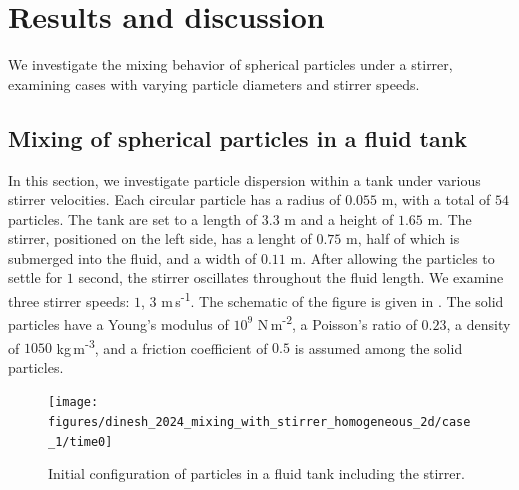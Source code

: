 \documentclass[preprint,12pt]{elsarticle}
\begin{document}











\FloatBarrier%
\section{Results and discussion}
\label{sec:results}
We investigate the mixing behavior of spherical particles under a stirrer,
examining cases with varying particle diameters and stirrer speeds.

\subsection{Mixing of spherical particles in a fluid tank}
\label{sec:mixing-spherical-particles-in-fluid-tank-homogeneous}
In this section, we investigate particle dispersion within a tank under
various stirrer velocities. Each circular particle has a radius of $0.055$ m,
with a total of $54$ particles. The tank are set to a length of $3.3$ m and a
height of $1.65$ m. The stirrer, positioned on the left side, has a lenght of
$0.75$ m, half of which is submerged into the fluid, and a width of $0.11$
m. After allowing the particles to settle for $1$ second, the stirrer
oscillates throughout the fluid length. We examine three stirrer speeds: $1$,
$3$ m\,s\textsuperscript{-1}.  The schematic of the figure is given in
. The solid particles have a
Young's modulus of $10^{9}$ N\,m\textsuperscript{-2}, a Poisson's ratio of
$0.23$, a density of $1050$ kg\,m\textsuperscript{-3}, and a friction
coefficient of $0.5$ is assumed among the solid particles.
\begin{figure}[!htpb]
  \centering
  \texttt{[image: figures/dinesh\_2024\_mixing\_with\_stirrer\_homogeneous\_2d/case\_1/time0]}
  \caption{ Initial configuration of particles in a fluid tank including the
    stirrer.}
  \label{fig:schematic-Dinesh-mixer-homogeneous}
\end{figure}
\end{document}
